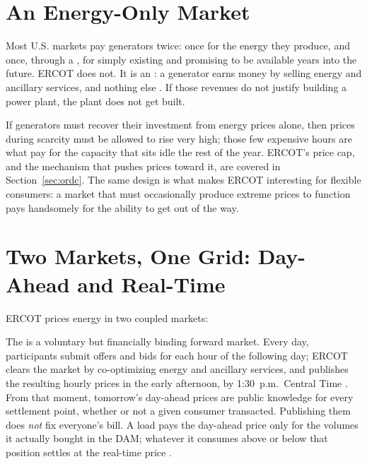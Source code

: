 \section{An Energy-Only Market}

Most U.S. markets pay generators twice: once for the energy they produce, and once, through a , for simply existing and promising to be available years into the future. ERCOT does not. It is an : a generator earns money by selling energy and ancillary services, and nothing else \autocite{ercot2025gridinsightsabout}. If those revenues do not justify building a power plant, the plant does not get built.

If generators must recover their investment from energy prices alone, then prices during scarcity must be allowed to rise very high; those few expensive hours are what pay for the capacity that sits idle the rest of the year. ERCOT's price cap, and the mechanism that pushes prices toward it, are covered in Section~\ref{sec:ordc}. The same design is what makes ERCOT interesting for flexible consumers: a market that must occasionally produce extreme prices to function pays handsomely for the ability to get out of the way.

\section{Two Markets, One Grid: Day-Ahead and Real-Time}
\label{sec:dam-rtm}

ERCOT prices energy in two coupled markets:

The  is a voluntary but financially binding forward market. Every day, participants submit offers and bids for each hour of the following day; ERCOT clears the market by co-optimizing energy and ancillary services, and publishes the resulting hourly prices in the early afternoon, by 1:30~p.m.\ Central Time \autocite{ercot2026dam,ercot2026protocols}. %
From that moment, tomorrow's day-ahead prices are public knowledge for every settlement point, whether or not a given consumer transacted. Publishing them does \emph{not} fix everyone's bill. A load pays the day-ahead price only for the volumes it actually bought in the DAM; whatever it consumes above or below that position settles at the real-time price \autocite{ercot2026protocols}. %

